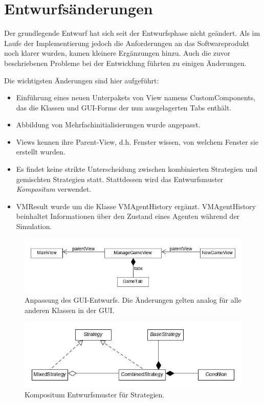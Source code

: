 \section{Entwurfsänderungen}

Der grundlegende Entwurf hat sich seit der Entwurfsphase nicht geändert. Als im Laufe der Implementierung jedoch die Anforderungen an das Softwareprodukt noch klarer wurden, kamen kleinere Ergänzungen hinzu. Auch die zuvor beschriebenen Probleme bei der Entwicklung führten zu einigen Änderungen.

Die wichtigsten Änderungen sind hier aufgeführt:

\begin{itemize}
\item Einführung eines neuen Unterpakets von View namens CustomComponents, das die Klassen und GUI-Forms der nun ausgelagerten Tabs enthält.

\item Abbildung von Mehrfachinitialisierungen wurde angepasst.

\item Views kennen ihre Parent-View, d.h. Fenster wissen, von welchem Fenster sie erstellt wurden.

\item Es findet keine strikte Unterscheidung zwischen kombinierten Strategien und gemischten Strategien statt. Stattdessen wird das Entwurfsmuster \emph{Kompositum} verwendet.

\item VMResult wurde um die Klasse VMAgentHistory ergänzt. VMAgentHistory beinhaltet Informationen über den Zustand eines Agenten während der Simulation. 

\end{itemize}

\begin{figure}[H]
	\centering
	\includegraphics[scale=0.5]{pse_update1.jpg}
	\caption{Anpassung des GUI-Entwurfs. Die Änderungen gelten analog für alle anderen Klassen in der GUI.}
\end{figure}

\begin{figure}[H]
	\centering
	\includegraphics[scale=0.5]{pse_update2.jpg}
	\caption{Kompositum Entwurfsmuster für Strategien.}
\end{figure}